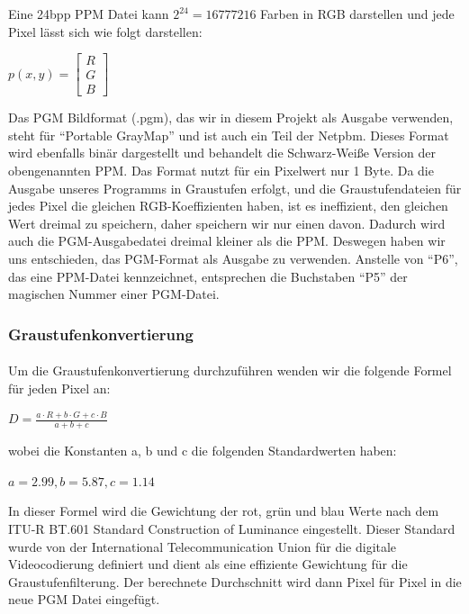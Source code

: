 \documentclass[course=erap]{aspdoc}
\begin{document}
Eine 24bpp PPM Datei kann $2^{24} = 16777216$ Farben in RGB darstellen und jede Pixel lässt sich wie folgt darstellen:
\begin{center}
    \( p(x, y) = \begin{bmatrix} R \\ G \\ B \end{bmatrix} \)
\end{center}
 
Das PGM Bildformat (.pgm), das wir in diesem Projekt als Ausgabe verwenden, steht für \enquote{Portable GrayMap} und ist auch ein Teil der Netpbm. Dieses Format wird ebenfalls binär 
dargestellt und behandelt die Schwarz-Weiße Version der obengenannten PPM. Das Format  nutzt für ein Pixelwert nur 1 Byte.  
Da die Ausgabe unseres Programms in Graustufen erfolgt, und die Graustufendateien für jedes Pixel die gleichen RGB-Koeffizienten haben, ist es ineffizient, den gleichen Wert dreimal zu speichern, daher speichern wir nur einen davon. 
Dadurch wird auch die PGM-Ausgabedatei dreimal kleiner als die PPM. Deswegen haben wir uns entschieden, das PGM-Format als Ausgabe zu verwenden.  
Anstelle von \enquote{P6}, das eine PPM-Datei kennzeichnet, entsprechen die Buchstaben \enquote{P5} der magischen Nummer einer PGM-Datei.

\subsubsection*{Graustufenkonvertierung}

\paragraph{}
Um die Graustufenkonvertierung durchzuführen wenden wir die folgende Formel für jeden Pixel an:

\begin{center}
    \( D = \frac{a \cdot R + b \cdot G + c \cdot B}{a + b + c} \)
\end{center}

wobei die Konstanten a, b und c die folgenden Standardwerten haben:

\begin{center}
    \(a = 2.99, b = 5.87, c = 1.14\)
\end{center}

In dieser Formel wird die Gewichtung der rot, grün und blau Werte nach dem ITU-R BT.601 Standard Construction of Luminance \cite{ITU-R_BT.601-7} eingestellt. 
Dieser Standard wurde von der International Telecommunication Union für die digitale Videocodierung definiert und dient als eine effiziente 
Gewichtung für die Graustufenfilterung. Der berechnete Durchschnitt wird dann Pixel für Pixel in die neue PGM Datei eingefügt.
\end{document}
